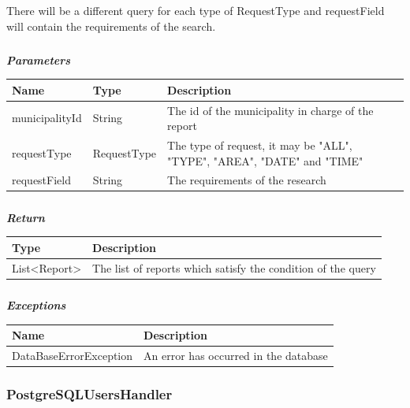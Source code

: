 							There will be a different query for each type of RequestType and requestField will contain the requirements of the search.
							\subparagraph{}
							\textit{\textbf{Parameters}}
							\vspace{-2mm}
								\begin{table}[!h]
									\begin{tabular}{L{0.2\textwidth}L{0.2\textwidth}L{0.4\textwidth}}
										\toprule
										\textbf{Name} & \textbf{Type} & \textbf{Description} \\
										\midrule
								  		municipalityId & String & The id of the municipality in charge of the report \\
								  		requestType & RequestType & The type of request, it may be "ALL", "TYPE", "AREA", "DATE" and "TIME" \\
								  		requestField & String & The requirements of the research \\
								 		\bottomrule
									\end{tabular}
								\end{table}
							\vspace{-6mm}
							\subparagraph{}
								\textit{\textbf{Return}}
								\vspace{-2mm}
									\begin{table}[!h]
									\begin{tabular}{L{0.25\textwidth}L{0.5\textwidth}}
										\toprule
										\textbf{Type} & \textbf{Description} \\
										\midrule
								  		List<Report> & The list of reports which satisfy the condition of the query \\
								 		\bottomrule
									\end{tabular}
								\end{table}
							\vspace{-6mm}
							\subparagraph{}
								\textit{\textbf{Exceptions}}
								\vspace{-2mm}
									\begin{table}[!h]
									\begin{tabular}{ll}
										\toprule
										\textbf{Name} & \textbf{Description} \\
										\midrule
								  		DataBaseErrorException & An error has occurred in the database \\ 
								 		\bottomrule
									\end{tabular}
								\end{table}
				\clearpage
				\subsubsection{PostgreSQLUsersHandler}
